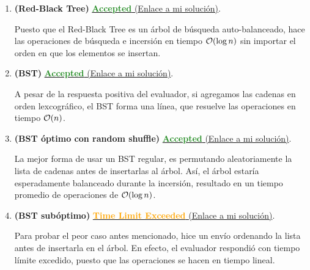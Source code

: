 \documentclass{article}
\begin{document}
    \begin{enumerate}[label=\textbf{Solución \arabic*}]
        \item \textbf{(Red-Black Tree)} \href{https://atcoder.jp/contests/abc164/submissions/75796791}{\textcolor{ForestGreen}{\textbf{Accepted}} (Enlace a mi solución)}.
        
        Puesto que el Red-Black Tree es un árbol de búsqueda auto-balanceado, hace las operaciones de búsqueda e incersión en tiempo ${\cal O}(\log n)$ sin importar el orden en que los elementos se insertan. 
        
        \item \textbf{(BST)} \href{https://atcoder.jp/contests/abc164/submissions/75796910}{\textcolor{ForestGreen}{\textbf{Accepted}} (Enlace a mi solución)}.
        
        A pesar de la respuesta positiva del evaluador, si agregamos las cadenas en orden lexcográfico, el BST forma una línea, que resuelve las operaciones en tiempo ${\cal O}(n)$.
        
        \item \textbf{(BST óptimo con random shuffle)} \href{https://atcoder.jp/contests/abc164/submissions/75813989}{\textcolor{ForestGreen}{\textbf{Accepted}} (Enlace a mi solución)}.
        
        La mejor forma de usar un BST regular, es permutando aleatoriamente la lista de cadenas antes de insertarlas al árbol. Así, el árbol estaría esperadamente balanceado durante la incersión, resultado en un tiempo promedio de operaciones de ${\cal O}(\log n)$.

        \item \textbf{(BST subóptimo)} \href{https://atcoder.jp/contests/abc164/submissions/75796972}{\textcolor{orange}{\textbf{Time Limit Exceeded}} (Enlace a mi solución)}.
        
        Para probar el peor caso antes mencionado, hice un envío ordenando la lista antes de insertarla en el árbol. En efecto, el evaluador respondió con tiempo límite excedido, puesto que las operaciones se hacen en tiempo lineal.
    \end{enumerate}
\end{document}
